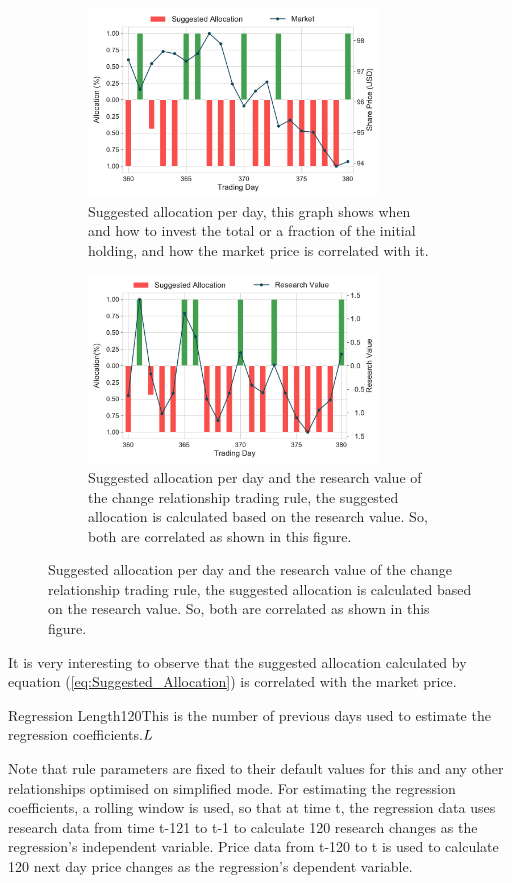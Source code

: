 \documentclass{article}%
\begin{document}
\begin{figure}[H]
 \begin{subfigure}{0.48\textwidth}
\includegraphics[width=0.9\linewidth, height=5cm]{Allocation_MarketSeries_360_380.pdf}
\caption{Suggested allocation per day, this graph shows when and how to invest the total or a fraction of the initial holding, and how the market price is correlated with it.}
\label{fig:02}
\end{subfigure}
\quad
\begin{subfigure}{0.48\textwidth}
\includegraphics[width=0.9\linewidth, height=5cm]{Allocation_ResearchValue_360_380.pdf}
\caption{Suggested allocation per day and the research value of the change relationship trading rule, the suggested allocation is calculated based on the research value. So, both are correlated as shown in this figure. }
\label{fig:04}
\end{subfigure}
\end{figure}
\justify  It is very interesting to observe that the suggested allocation calculated by equation (\ref{eq:Suggested_Allocation}) is correlated with the market price.

 \newpage
{}
{Regression Length}{120}{This is the number of previous days used to estimate the regression coefficients.}{$L$}%
\stoptable 

\vspace{1mm}
\justify Note that rule parameters are fixed to their default values for this and any other relationships optimised on simplified mode. For estimating the regression coefficients, a rolling window is used, so that at time t, the regression data uses research data from time t-121 to t-1 to calculate 120 research changes as the regression's independent variable. Price data from t-120 to t is used to calculate 120 next day price changes as the regression's dependent variable. %

\assumptions%
\keyterms%
\furtherlinks%
\end{document}
